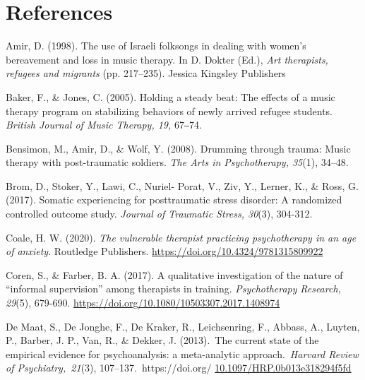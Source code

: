 \documentclass[authordate, empirical, issue]{jote-new-article}
\begin{document}
\section{References}



\hspace*{\parindent}Amir, D. (1998). The use of Israeli folksongs in dealing with women's bereavement and loss in music therapy. In D. Dokter (Ed.), \emph{Art therapists, refugees and migrants} (pp. 217--235). Jessica Kingsley Publishers



Baker, F., \& Jones, C. (2005). Holding a steady beat: The effects of a music therapy program on stabilizing behaviors of newly arrived refugee students. \emph{British Journal of Music Therapy, 19, }67‒74.



Bensimon, M., Amir, D., \& Wolf, Y. (2008). Drumming through trauma: Music therapy with post-traumatic soldiers. \emph{The Arts in Psychotherapy, 35}(1), 34--48.



Brom, D., Stoker, Y., Lawi, C., Nuriel- Porat, V., Ziv, Y., Lerner, K., \& Ross, G. (2017). Somatic experiencing for posttraumatic stress disorder: A randomized controlled outcome study. \emph{Journal of Traumatic Stress, 30}(3), 304-312.



Coale, H. W. (2020). \emph{The vulnerable therapist practicing psychotherapy in an age of anxiety}. Routledge Publishers. \href{https://DOI.org/10.4324/9781315809922}{https://doi.org/10.4324/9781315809922}



Coren, S., \& Farber, B. A. (2017). A qualitative investigation of the nature of “informal supervision” among therapists in training. \emph{Psychotherapy}\emph{ Research}\emph{, 29}(5), 679-690. \href{https://doi.org/10.1080/10503307.2017.1408974}{https://doi.org/10.1080/10503307.2017.1408974}



De Maat, S., De Jonghe, F., De Kraker, R., Leichsenring, F., Abbass, A., Luyten, P., Barber, J. P., Van, R., \& Dekker, J. (2013). The current state of the empirical evidence for psychoanalysis: a meta-analytic approach. \emph{Harvard Review of Psychiatry, 21}(3), 107--137. https://doi.org/ \href{https://doi.org/10.1097%252FHRP.0b013e318294f5fd}{10.1097/HRP.0b013e318294f5fd}
\end{document}
